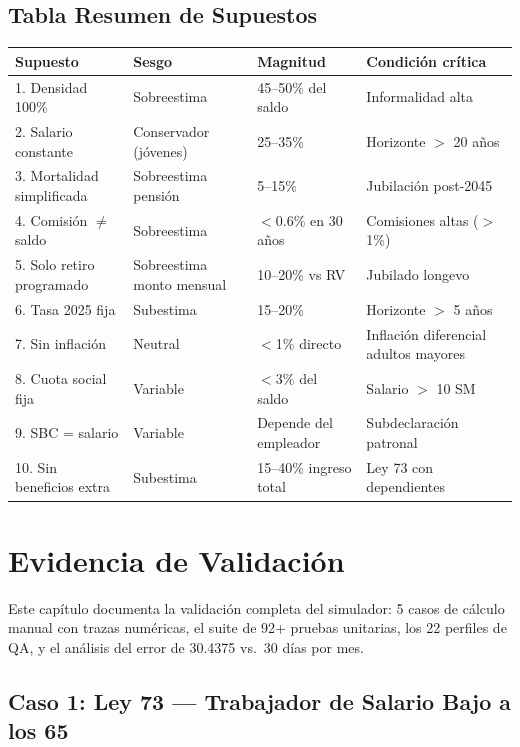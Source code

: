 \documentclass[11pt,a4paper]{report}
\begin{document}
\section{Tabla Resumen de Supuestos}

\begin{longtable}{p{3.5cm}p{2.5cm}p{3cm}p{4cm}}
\toprule
\textbf{Supuesto} & \textbf{Sesgo} & \textbf{Magnitud} & \textbf{Condici\'on cr\'itica} \\
\midrule
\endhead
1. Densidad 100\% & Sobreestima & 45--50\% del saldo & Informalidad alta \\
2. Salario constante & Conservador (j\'ovenes) & 25--35\% & Horizonte $>$ 20 a\~nos \\
3. Mortalidad simplificada & Sobreestima pensi\'on & 5--15\% & Jubilaci\'on post-2045 \\
4. Comisi\'on $\neq$ saldo & Sobreestima & $<$0.6\% en 30 a\~nos & Comisiones altas ($>$1\%) \\
5. Solo retiro programado & Sobreestima monto mensual & 10--20\% vs RV & Jubilado longevo \\
6. Tasa 2025 fija & Subestima & 15--20\% & Horizonte $>$ 5 a\~nos \\
7. Sin inflaci\'on & Neutral & $<$1\% directo & Inflaci\'on diferencial adultos mayores \\
8. Cuota social fija & Variable & $<$3\% del saldo & Salario $>$ 10 SM \\
9. SBC = salario & Variable & Depende del empleador & Subdeclaraci\'on patronal \\
10. Sin beneficios extra & Subestima & 15--40\% ingreso total & Ley 73 con dependientes \\
\bottomrule
\end{longtable}



\chapter{Evidencia de Validaci\'on}

Este cap\'itulo documenta la validaci\'on completa del simulador: 5 casos de c\'alculo manual con trazas num\'ericas, el suite de 92+ pruebas unitarias, los 22 perfiles de QA, y el an\'alisis del error de 30.4375 vs.\ 30 d\'ias por mes.

\section{Caso 1: Ley 73 --- Trabajador de Salario Bajo a los 65}
\end{document}
